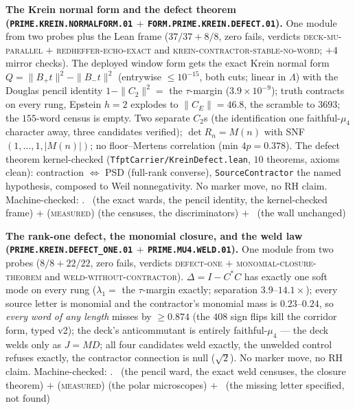 \par\smallskip\noindent\textbf{The Krein normal form and the
defect theorem
(\texttt{PRIME.KREIN.\allowbreak NORMALFORM.01} $+$
\texttt{FORM.PRIME.\allowbreak KREIN.\allowbreak DEFECT.01}).}
One module from two probes plus the Lean frame ($37/37 + 8/8$,
zero fails, verdicts \textsc{deck-mu-parallel} $+$
\textsc{redheffer-echo-exact} and
\textsc{krein-contractor-stable-no-word}; $+4$ mirror checks).
The deployed window form gets the exact Krein normal form
$Q = \|B_+t\|^2 - \|B_-t\|^2$ (entrywise $\le 10^{-15}$, both
cuts; linear in $\Lambda$) with the Douglas pencil identity
$1 - \|C_2\|^2 = $ the $\tau$-margin ($3.9\times10^{-9}$);
truth contracts on every rung, Epstein $h{=}2$ explodes to
$\|C_E\| = 46.8$, the scramble to $3693$; the $155$-word census
is empty.  Two separate $C_2$s (the identification one
faithful-$\mu_4$ character away, three candidates verified);
$\det R_n = M(n)$ with SNF $(1,\dots,1,|M(n)|)$; no
floor--Mertens correlation (min $4p = 0.378$).  The defect
theorem kernel-checked
(\texttt{TfptCarrier/KreinDefect.lean}, $10$ theorems, axioms
clean): contraction $\Leftrightarrow$ PSD (full-rank converse),
\texttt{SourceContractor} the named hypothesis, composed to
Weil nonnegativity.  No marker move, no RH claim.
Machine-checked: .
\mE\ (the exact wards, the pencil identity, the kernel-checked
frame) $+$ (\textsc{measured}) (the censuses, the
discriminators) $+$ \mO\ (the wall unchanged)
\par\smallskip


\par\smallskip\noindent\textbf{The rank-one defect, the monomial
closure, and the weld law
(\texttt{PRIME.KREIN.\allowbreak DEFECT\_ONE.01} $+$
\texttt{PRIME.MU4.\allowbreak WELD.01}).}
One module from two probes ($8/8 + 22/22$, zero fails, verdicts
\textsc{defect-one} $+$ \textsc{monomial-closure-theorem} and
\textsc{weld-without-contractor}).  $\Delta = I - C^*C$ has
exactly one soft mode on every rung ($\lambda_1 = $ the
$\tau$-margin exactly; separation $3.9$--$14.1\times$); every
source letter is monomial and the contractor's monomial mass is
$0.23$--$0.24$, so \emph{every word of any length} misses by
$\ge 0.874$ (the $408$ sign flips kill the corridor form, typed
v2); the deck's anticommutant is entirely faithful-$\mu_4$ ---
the deck welds only as $J = MD$; all four candidates weld
exactly, the unwelded control refuses exactly, the contractor
connection is null ($\sqrt2$).  No marker move, no RH claim.
Machine-checked: .
\mE\ (the pencil ward, the exact weld censuses, the closure
theorem) $+$ (\textsc{measured}) (the polar microscopes) $+$
\mO\ (the missing letter specified, not found)
\par\smallskip


